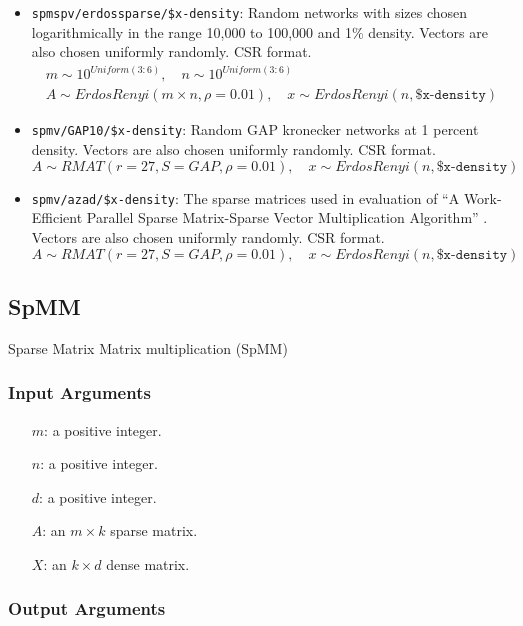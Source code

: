 \documentclass{article}
\begin{document}
\begin{itemize}
	\item \texttt{spmspv/erdossparse/\$x-density}: Random networks with sizes chosen logarithmically in the range 10,000 to 100,000 and 1\% density. Vectors are also chosen uniformly randomly. CSR format.
	\begin{multline*}
		m \sim 10^{Uniform(3:6)}, \quad n \sim 10^{Uniform(3:6)} \\
			A \sim ErdosRenyi\left(m\times n, \rho=0.01\right), \quad x \sim  ErdosRenyi\left(n, \texttt{\$x-density}\right)
	\end{multline*}
	\item \texttt{spmv/GAP10/\$x-density}: Random GAP kronecker networks at 1 percent
	density. Vectors are also chosen uniformly randomly. CSR format.
	\[
		A \sim RMAT\left(r=27, S = GAP, \rho = 0.01\right), \quad x \sim  ErdosRenyi\left(n, \texttt{\$x-density}\right)
	\]
	\item \texttt{spmv/azad/\$x-density}: The sparse matrices used in evaluation of
	``A Work-Efficient Parallel Sparse Matrix-Sparse Vector Multiplication Algorithm'' \cite{azad_work-efficient_2017}. Vectors are also chosen uniformly randomly. CSR format.
	\[
		A \sim RMAT\left(r=27, S = GAP, \rho = 0.01\right), \quad x \sim  ErdosRenyi\left(n, \texttt{\$x-density}\right)
	\]
\end{itemize}

\subsection{SpMM}
Sparse Matrix Matrix multiplication (SpMM)
\subsubsection{Input Arguments}

\begin{itemize}
	\item[$m$:] a positive integer.
	\item[$n$:] a positive integer.
	\item[$d$:] a positive integer.
	\item[$A$:] an $m \times k$ sparse matrix.
	\item[$X$:] an $k \times d$ dense matrix.
\end{itemize}

\subsubsection{Output Arguments}
\end{document}
